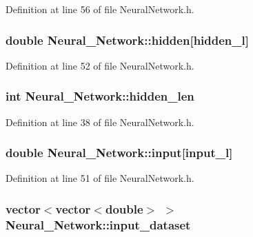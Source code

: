 Definition at line 56 of file Neural\-Network.\-h.

\hypertarget{a00003_a5b31deacdc5c63e687d6ebc086b761ab}{
\subsubsection[{hidden}]{\setlength{\rightskip}{0pt plus 5cm}double Neural\-\_\-\-Network\-::hidden\mbox{[}{\bf hidden\-\_\-l}\mbox{]}\hspace{0.3cm}{\ttfamily [private]}}}\label{d1/d7c/a00003_a5b31deacdc5c63e687d6ebc086b761ab}


Definition at line 52 of file Neural\-Network.\-h.

\hypertarget{a00003_a71cc8ca03da47fe639dd1e8ed518069c}{
\subsubsection[{hidden\-\_\-len}]{\setlength{\rightskip}{0pt plus 5cm}int Neural\-\_\-\-Network\-::hidden\-\_\-len\hspace{0.3cm}{\ttfamily [private]}}}\label{d1/d7c/a00003_a71cc8ca03da47fe639dd1e8ed518069c}


Definition at line 38 of file Neural\-Network.\-h.

\hypertarget{a00003_a347a1fceb1ac048ecd913a89126cebb3}{
\subsubsection[{input}]{\setlength{\rightskip}{0pt plus 5cm}double Neural\-\_\-\-Network\-::input\mbox{[}{\bf input\-\_\-l}\mbox{]}\hspace{0.3cm}{\ttfamily [private]}}}\label{d1/d7c/a00003_a347a1fceb1ac048ecd913a89126cebb3}


Definition at line 51 of file Neural\-Network.\-h.

\hypertarget{a00003_a81bab51b36643c5b10ba25d518c27ff3}{
\subsubsection[{input\-\_\-dataset}]{\setlength{\rightskip}{0pt plus 5cm}vector$<$vector$<$double$>$ $>$ Neural\-\_\-\-Network\-::input\-\_\-dataset\hspace{0.3cm}{\ttfamily [private]}}}\label{d1/d7c/a00003_a81bab51b36643c5b10ba25d518c27ff3}


